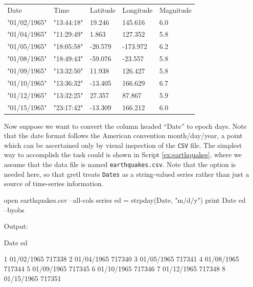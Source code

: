 \begin{center}
  \begin{small}
      \begin{tabular}{lllll}
        Date	& Time	& Latitude	& Longitude                & Magnitude \\
        "01/02/1965"	& "13:44:18"	& 19.246	& 145.616  & 6.0       \\
        "01/04/1965"	& "11:29:49"	& 1.863	        & 127.352  & 5.8       \\
        "01/05/1965"	& "18:05:58"	& -20.579	& -173.972 & 6.2       \\
        "01/08/1965"	& "18:49:43"	& -59.076	& -23.557  & 5.8       \\
        "01/09/1965"	& "13:32:50"	& 11.938	& 126.427  & 5.8       \\
        "01/10/1965"	& "13:36:32"	& -13.405	& 166.629  & 6.7       \\
        "01/12/1965"	& "13:32:25"	& 27.357	& 87.867   & 5.9       \\
        "01/15/1965"	& "23:17:42"	& -13.309	& 166.212  & 6.0       
      \end{tabular}
  \end{small}
\end{center}

Now suppose we want to convert the column headed ``Date'' to epoch
days. Note that the date format follows the American convention
month/day/year, a point which can be ascertained only by visual
inspection of the \texttt{CSV} file. The simplest way to accomplish
the task could is shown in Script \ref{ex:earthquakes}, where we
assume that the data file is named \texttt{earthquakes.csv}. Note that
the  option is needed here, so that gretl treats
\texttt{Dates} as a string-valued series rather than just a source
of time-series information.

\begin{script}[htbp]
  \label{ex:earthquakes}
\begin{scodebit}
open earthquakes.csv --all-cols
series ed = strpday(Date, "m/d/y")
print Date ed --byobs
\end{scodebit}
  
Output:
\begin{outbit}
          Date           ed

1   01/02/1965       717338
2   01/04/1965       717340
3   01/05/1965       717341
4   01/08/1965       717344
5   01/09/1965       717345
6   01/10/1965       717346
7   01/12/1965       717348
8   01/15/1965       717351
\end{outbit}
\end{script}

